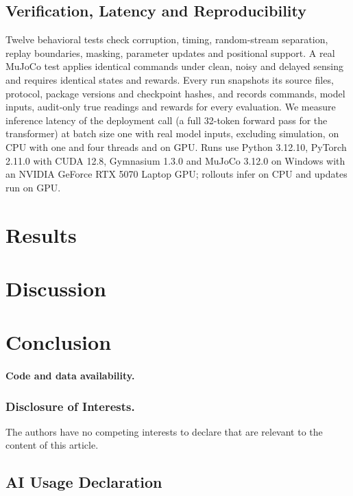 \documentclass[runningheads]{llncs}
\begin{document}
\subsection{Verification, Latency and Reproducibility}
Twelve behavioral tests check corruption, timing, random-stream separation, replay boundaries, masking, parameter updates and positional support. A real MuJoCo test applies identical commands under clean, noisy and delayed sensing and requires identical states and rewards. Every run snapshots its source files, protocol, package versions and checkpoint hashes, and records commands, model inputs, audit-only true readings and rewards for every evaluation. We measure inference latency of the deployment call (a full 32-token forward pass for the transformer) at batch size one with real model inputs, excluding simulation, on CPU with one and four threads and on GPU. Runs use Python 3.12.10, PyTorch 2.11.0 with CUDA 12.8, Gymnasium 1.3.0 and MuJoCo 3.12.0 on Windows with an NVIDIA GeForce RTX 5070 Laptop GPU; rollouts infer on CPU and updates run on GPU.

\section{Results}


\section{Discussion}


\section{Conclusion}


\paragraph{Code and data availability.} 

{\small\subsubsection*{Disclosure of Interests.} The authors have no competing interests to declare that are relevant to the content of this article.\par}

\begin{samepage}
\section*{AI Usage Declaration}

\par\end{samepage}


\end{document}
